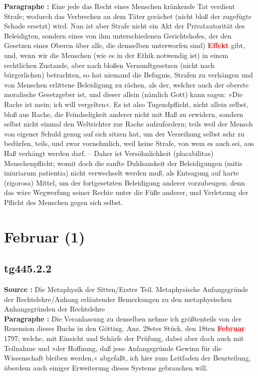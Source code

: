 \documentclass[a4paper,12pt,twoside]{book}
\newcommand{\match}[1]{\textcolor{red}{\textbf{#1}}}
\newcommand{\unnumberedsection}[1]{
	\section*{#1}
	\addcontentsline{toc}{section}{#1}
	\markright{#1}
}
\begin{document}
	\textbf{Paragraphe : }Eine jede das Recht eines Menschen kränkende Tat verdient Strafe; wodurch das Verbrechen an dem Täter gerächet (nicht bloß der zugefügte Schade ersetzt) wird. Nun ist aber Strafe nicht ein Akt der Privatautorität des Beleidigten, sondern eines von ihm unterschiedenen Gerichtshofes, der den Gesetzen eines Oberen über alle, die demselben unterworfen sind) \match{Effekt} gibt, und, wenn wir die Menschen (wie es in der Ethik notwendig ist) in einem rechtlichen Zustande, aber nach bloßen Vernunftgesetzen (nicht nach bürgerlichen) betrachten, so hat niemand die Befugnis, Strafen zu verhängen und von Menschen erlittene Beleidigung zu rächen, als der, welcher auch der oberste moralische Gesetzgeber ist, und dieser allein (nämlich Gott) kann sagen: »Die Rache ist mein; ich will vergelten«. Es ist also Tugendpflicht, nicht allein selbst, bloß aus Rache, die  Feindseligkeit anderer nicht mit Haß zu erwidern, sondern selbst nicht einmal den Weltrichter zur Rache aufzufordern; teils weil der Mensch von eigener Schuld genug auf sich sitzen hat, um der Verzeihung selbst sehr zu bedürfen, teils, und zwar vornehmlich, weil keine Strafe, von wem es auch sei, aus Haß verhängt werden darf. – Daher ist Versöhnlichkeit (placabilitas) Menschenpflicht; womit doch die sanfte Duldsamkeit der Beleidigungen (mitis iniuriarum patientia) nicht verwechselt werden muß, als Entsagung auf harte (rigorosa) Mittel, um der fortgesetzten Beleidigung anderer vorzubeugen; denn das wäre Wegwerfung seiner Rechte unter die Füße anderer, und Verletzung der Pflicht des Menschen gegen sich selbst. 
	
	\unnumberedsection{Februar (1)} 
	\subsection*{tg445.2.2} 
	\textbf{Source : }Die Metaphysik der Sitten/Erster Teil. Metaphysische Anfangsgründe der Rechtslehre/Anhang erläutender Bemerkungen zu den metaphysischen Anhangsgründen der Rechtslehre\\  
	
	\textbf{Paragraphe : }Die Veranlassung zu denselben nehme ich größtenteils von der Rezension dieses Buchs in den Götting. Anz. 28stes Stück, den 18ten \match{Februar} 1797; welche, mit Einsicht und Schärfe der Prüfung, dabei aber doch auch mit Teilnahme und »der Hoffnung, daß jene Anfangsgründe Gewinn für die Wissenschaft bleiben werden,« abgefaßt, ich hier zum Leitfaden der Beurteilung, überdem auch einiger Erweiterung dieses Systems gebrauchen will. 
	
\end{document}
